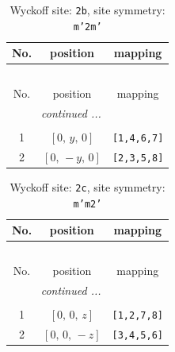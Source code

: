 \documentclass[fleqn,8pt]{jsarticle}
\begin{document}
\begin{longtable}{ccc}
\caption{Wyckoff site: {\tt 2b}, site symmetry: {\tt m'2m'}}
 \\
 \hline \hline
No. & position & mapping \\ \hline \endfirsthead

\multicolumn{2}{l}{\tablename\ \thetable{}} \\
 \hline \hline
No. & position & mapping \\ \hline \endhead

 \hline \hline
\multicolumn{2}{r}{\footnotesize\it continued ...} \\ \endfoot

 \hline \hline
\multicolumn{2}{r}{} \\ \endlastfoot

1 & $\left[ 0,\, y,\, 0 \right]$ & {\tt [1,4,6,7]} \\ \hline
2 & $\left[ 0,\, - y,\, 0 \right]$ & {\tt [2,3,5,8]} \\
\end{longtable}
\renewcommand{\arraystretch}{1.2}
\begin{longtable}{ccc}
\caption{Wyckoff site: {\tt 2c}, site symmetry: {\tt m'm2'}}
 \\
 \hline \hline
No. & position & mapping \\ \hline \endfirsthead

\multicolumn{2}{l}{\tablename\ \thetable{}} \\
 \hline \hline
No. & position & mapping \\ \hline \endhead

 \hline \hline
\multicolumn{2}{r}{\footnotesize\it continued ...} \\ \endfoot

 \hline \hline
\multicolumn{2}{r}{} \\ \endlastfoot

1 & $\left[ 0,\, 0,\, z \right]$ & {\tt [1,2,7,8]} \\ \hline
2 & $\left[ 0,\, 0,\, - z \right]$ & {\tt [3,4,5,6]} \\
\end{longtable}
\renewcommand{\arraystretch}{1.2}
\end{document}
